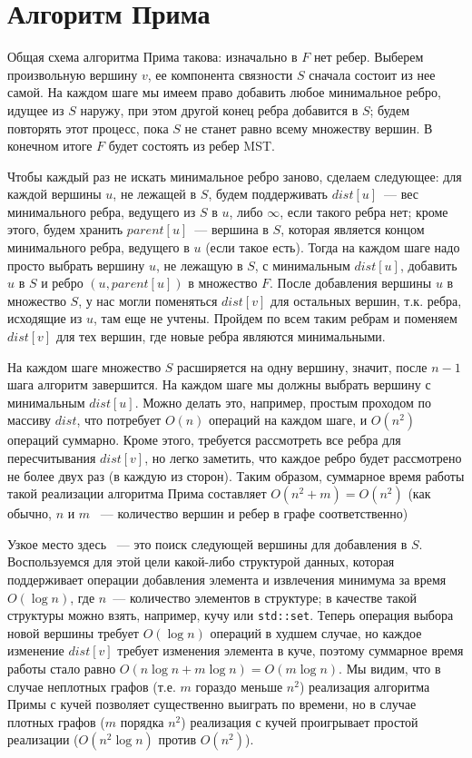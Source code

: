 \documentclass[12pt]{article}
\begin{document}
\section{Алгоритм Прима}

Общая схема алгоритма Прима такова: изначально в $F$ нет ребер. Выберем произвольную вершину $v$, ее компонента связности $S$ сначала состоит из нее самой. На каждом шаге мы имеем право добавить любое минимальное ребро, идущее из $S$ наружу, при этом другой конец ребра добавится в $S$; будем повторять этот процесс, пока $S$ не станет равно всему множеству вершин. В конечном итоге $F$ будет состоять из ребер MST.

Чтобы каждый раз не искать минимальное ребро заново, сделаем следующее: для каждой вершины $u$, не лежащей в $S$, будем поддерживать $dist[u]$~--- вес минимального ребра, ведущего из $S$ в $u$, либо $\infty$, если такого ребра нет; кроме этого, будем хранить $parent[u]$~--- вершина в $S$, которая является концом минимального ребра, ведущего в $u$ (если такое есть). Тогда на каждом шаге надо просто выбрать вершину $u$, не лежащую в $S$, с минимальным $dist[u]$, добавить $u$ в $S$ и ребро $(u, parent[u])$ в множество $F$. После добавления вершины $u$ в множество $S$, у нас могли поменяться $dist[v]$ для остальных вершин, т.к. ребра, исходящие из $u$, там еще не учтены. Пройдем по всем таким ребрам и поменяем $dist[v]$ для тех вершин, где новые ребра являются минимальными.

На каждом шаге множество $S$ расширяется на одну вершину, значит, после $n-1$ шага алгоритм завершится. На каждом шаге мы должны выбрать вершину с минимальным $dist[u]$. Можно делать это, например, простым проходом по массиву $dist$, что потребует $O(n)$ операций на каждом шаге, и $O(n^2)$ операций суммарно. Кроме этого, требуется рассмотреть все ребра для пересчитывания $dist[v]$, но легко заметить, что каждое ребро будет рассмотрено не более двух раз (в каждую из сторон). Таким образом, суммарное время работы такой реализации алгоритма Прима составляет $O(n^2 + m) = O(n^2)$ (как обычно, $n$ и $m$ ~--- количество вершин и ребер в графе соответственно)

Узкое место здесь ~--- это поиск следующей вершины для добавления в $S$. Воспользуемся для этой цели какой-либо структурой данных, которая поддерживает операции добавления элемента и извлечения минимума за время $O(\log n)$, где $n$~--- количество элементов в структуре; в качестве такой структуры можно взять, например, кучу или \texttt{std::set}. Теперь операция выбора новой вершины требует $O(\log n)$ операций в худшем случае, но каждое изменение $dist[v]$ требует изменения элемента в куче, поэтому суммарное время работы стало равно $O(n \log n + m \log n) = O(m \log n)$. Мы видим, что в случае неплотных графов (т.е. $m$ гораздо меньше $n^2$) реализация алгоритма Примы с кучей позволяет существенно выиграть по времени, но в случае плотных графов ($m$ порядка $n^2$) реализация с кучей проигрывает простой реализации ($O(n^2 \log n)$ против $O(n^2)$).
\end{document}
